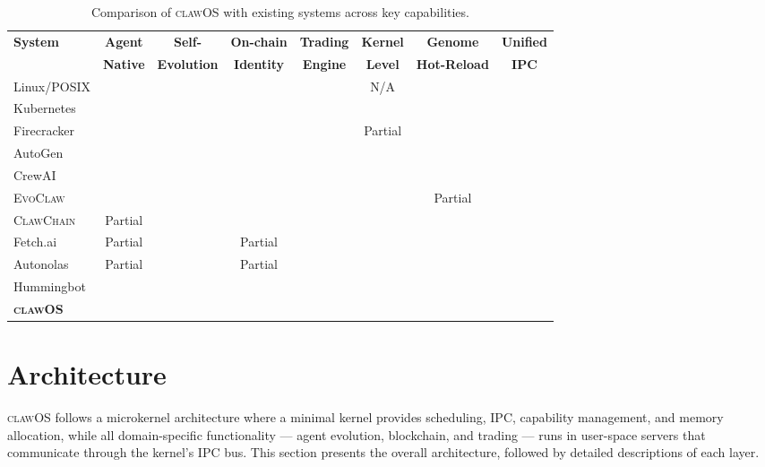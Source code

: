 \documentclass{article}
\newcommand{\clawos}{\textsc{clawOS}}
\newcommand{\evoclaw}{\textsc{EvoClaw}}
\newcommand{\clawchain}{\textsc{ClawChain}}
\newcommand{\cmark}{\ding{51}}
\newcommand{\xmark}{\ding{55}}
\begin{document}
\begin{table}[t]
\caption{Comparison of \clawos{} with existing systems across key capabilities.}
\label{tab:comparison}
\centering
\small
\begin{tabular}{lccccccc}
\toprule
\textbf{System} & \textbf{Agent} & \textbf{Self-} & \textbf{On-chain} & \textbf{Trading} & \textbf{Kernel} & \textbf{Genome} & \textbf{Unified} \\
 & \textbf{Native} & \textbf{Evolution} & \textbf{Identity} & \textbf{Engine} & \textbf{Level} & \textbf{Hot-Reload} & \textbf{IPC} \\
\midrule
Linux/POSIX & \xmark & \xmark & \xmark & \xmark & N/A & \xmark & \xmark \\
Kubernetes & \xmark & \xmark & \xmark & \xmark & \xmark & \xmark & \xmark \\
Firecracker & \xmark & \xmark & \xmark & \xmark & Partial & \xmark & \xmark \\
AutoGen & \cmark & \xmark & \xmark & \xmark & \xmark & \xmark & \xmark \\
CrewAI & \cmark & \xmark & \xmark & \xmark & \xmark & \xmark & \xmark \\
\evoclaw{} & \cmark & \cmark & \xmark & \xmark & \xmark & Partial & \xmark \\
\clawchain{} & Partial & \xmark & \cmark & \xmark & \xmark & \xmark & \xmark \\
Fetch.ai & Partial & \xmark & Partial & \xmark & \xmark & \xmark & \xmark \\
Autonolas & Partial & \xmark & Partial & \xmark & \xmark & \xmark & \xmark \\
Hummingbot & \xmark & \xmark & \xmark & \cmark & \xmark & \xmark & \xmark \\
\midrule
\textbf{\clawos{}} & \cmark & \cmark & \cmark & \cmark & \cmark & \cmark & \cmark \\
\bottomrule
\end{tabular}
\end{table}

%
%

\section{Architecture}
\label{sec:architecture}

\clawos{} follows a microkernel architecture where a minimal kernel provides scheduling, IPC, capability management, and memory allocation, while all domain-specific functionality — agent evolution, blockchain, and trading — runs in user-space servers that communicate through the kernel's IPC bus. This section presents the overall architecture, followed by detailed descriptions of each layer.
\end{document}
